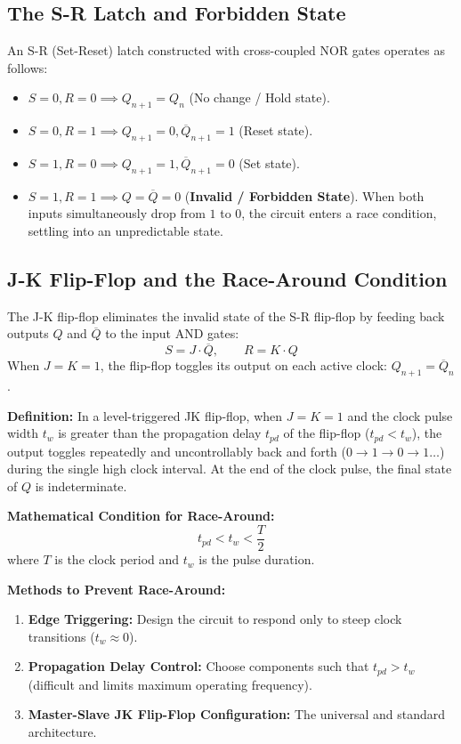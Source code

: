 \documentclass[12pt,a4paper]{article}
\begin{document}
\subsection{The S-R Latch and Forbidden State}
An S-R (Set-Reset) latch constructed with cross-coupled NOR gates operates as follows:
\begin{itemize}[leftmargin=*, itemsep=3pt]
  \item $S=0, R=0 \implies Q_{n+1} = Q_n$ (No change / Hold state).
  \item $S=0, R=1 \implies Q_{n+1} = 0, \overline{Q}_{n+1} = 1$ (Reset state).
  \item $S=1, R=0 \implies Q_{n+1} = 1, \overline{Q}_{n+1} = 0$ (Set state).
  \item $S=1, R=1 \implies Q = \overline{Q} = 0$ (\textbf{Invalid / Forbidden State}). When both inputs simultaneously drop from $1$ to $0$, the circuit enters a race condition, settling into an unpredictable state.
\end{itemize}

\subsection{J-K Flip-Flop and the Race-Around Condition}
The J-K flip-flop eliminates the invalid state of the S-R flip-flop by feeding back outputs $Q$ and $\overline{Q}$ to the input AND gates:
\begin{equation}
  S = J \cdot \overline{Q}, \qquad R = K \cdot Q
\end{equation}
When $J = K = 1$, the flip-flop toggles its output on each active clock: $Q_{n+1} = \overline{Q}_n$.

\begin{tcolorbox}[defbox, title={\textbf{The Race-Around Condition in Level-Triggered JK Flip-Flops}}]
\textbf{Definition:} In a level-triggered JK flip-flop, when $J = K = 1$ and the clock pulse width $t_w$ is greater than the propagation delay $t_{pd}$ of the flip-flop ($t_{pd} < t_w$), the output toggles repeatedly and uncontrollably back and forth ($0 \to 1 \to 0 \to 1 \dots$) during the single high clock interval. At the end of the clock pulse, the final state of $Q$ is indeterminate.

\textbf{Mathematical Condition for Race-Around:}
\begin{equation}
  t_{pd} < t_w < \frac{T}{2}
\end{equation}
where $T$ is the clock period and $t_w$ is the pulse duration.

\textbf{Methods to Prevent Race-Around:}
\begin{enumerate}[label=\alph*., leftmargin=*]
  \item \textbf{Edge Triggering:} Design the circuit to respond only to steep clock transitions ($t_w \approx 0$).
  \item \textbf{Propagation Delay Control:} Choose components such that $t_{pd} > t_w$ (difficult and limits maximum operating frequency).
  \item \textbf{Master-Slave JK Flip-Flop Configuration:} The universal and standard architecture.
\end{enumerate}
\end{tcolorbox}
\end{document}
